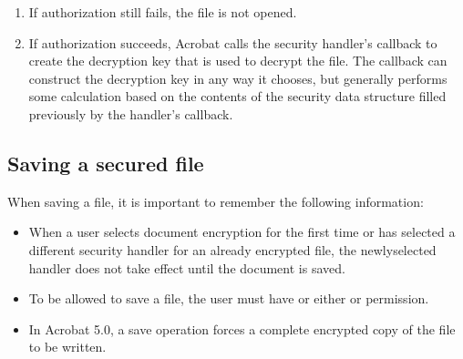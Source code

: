 \documentclass[letterpaper,12pt,english,openany,oneside]{sphinxmanual}
\begin{document}
\begin{enumerate}
\item {} 
If authorization still fails, the file is not opened.

\item {} 
If authorization succeeds, Acrobat calls the security handler’s  callback to create the decryption key that is used to decrypt the file. The  callback can construct the decryption key in any way it chooses, but generally performs some calculation based on the contents of the security data structure filled previously by the handler’s  callback.

\end{enumerate}


\subsection{Saving a secured file}
\label{\detokenize{Plugins_Security:saving-a-secured-file}}
When saving a file, it is important to remember the following information:
\begin{itemize}
\item {} 
When a user selects document encryption for the first time or has selected a different security handler for an already encrypted file, the newly\sphinxhyphen{}selected handler does not take effect until the document is saved.

\item {} 
To be allowed to save a file, the user must have  or either  or  permission.

\item {} 
In Acrobat 5.0, a save operation forces a complete encrypted copy of the file to be written.

\end{itemize}
\end{document}
